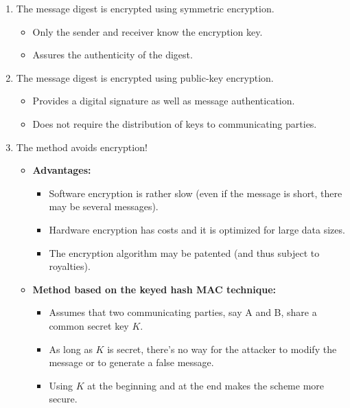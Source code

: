 \documentclass{article}
\begin{document}
                                \begin{enumerate}[label=\alph*]
                                    \item The message digest is encrypted using symmetric encryption.
                                    \begin{itemize}
                                        \item Only the sender and receiver know the encryption key.
                                        \item Assures the authenticity of the digest.
                                    \end{itemize}
                                    \item The message digest is encrypted using public-key encryption.
                                    \begin{itemize}
                                        \item Provides a digital signature as well as message authentication.
                                        \item Does not require the distribution of keys to communicating parties.
                                    \end{itemize}
                                    \item The method avoids encryption!
                                    \begin{itemize}
                                        \item \textbf{Advantages:}
                                        \begin{itemize}
                                            \item Software encryption is rather slow (even if the message is short, there may be several messages).
                                            \item Hardware encryption has costs and it is optimized for large data sizes.
                                            \item The encryption algorithm may be patented (and thus subject to royalties).
                                        \end{itemize}
                                        \item \textbf{Method based on the keyed hash MAC technique:}
                                        \begin{itemize}
                                            \item Assumes that two communicating parties, say A and B, share a common secret key \( K \).
                                            \item As long as \( K \) is secret, there’s no way for the attacker to modify the message or to generate a false message.
                                            \item Using \( K \) at the beginning and at the end makes the scheme more secure.
                                        \end{itemize}
                                    \end{itemize}
                                \end{enumerate}
\end{document}
